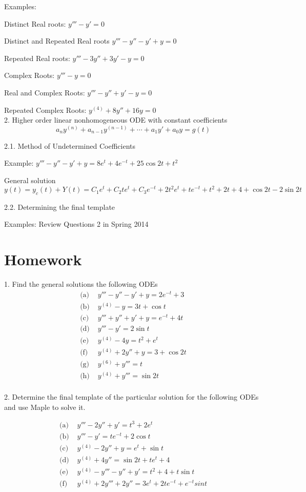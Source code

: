 \documentclass[11pt]{article}
\begin{document}
Examples: 

Distinct Real roots: $y''' - y' = 0$

Distinct and Repeated Real roots $y''' - y'' - y' + y = 0$

Repeated Real roots: $y'''-3y''+3y'-y=0$

Complex Roots: $y''' - y = 0$

Real and Complex Roots: $y''' - y'' + y' - y = 0$

Repeated Complex Roots: $y^{(4)} + 8y'' + 16 y = 0$\\

2. Higher order linear nonhomogeneous ODE with constant coefficients
$$a_n y^{(n)} + a_{n-1}y^{(n-1)}+ \cdots + a_1 y' + a_0 y = g(t)$$


2.1. Method of Undetermined Coefficients

Example: $y''' - y'' - y' + y = 8e^t + 4e^{-t} + 25\cos 2t + t^2 $

General solution
$$y(t)=y_c(t)+Y(t)=C_1e^t + C_2 te^t + C_3 e^{-t}+2t^2 e^t+  te^{-t} + t^2 + 2t + 4 + \cos 2t - 2\sin 2t$$

2.2. Determining the final template

Examples: Review Questions 2 in Spring 2014

\newpage
\section*{Homework}

1. Find the general solutions the following ODEs
$$
\begin{aligned}
\text{(a)  }& y''' - y'' - y' + y = 2e^{-t} + 3\\
\text{(b)  }& y^{(4)} - y = 3t + \cos t\\
\text{(c)  }& y''' + y'' + y' + y = e^{-t} + 4t\\
\text{(d)  }& y''' - y' = 2 \sin t\\
\text{(e)  }& y^{(4)} - 4y = t^2 + e^t\\
\text{(f)  }& y^{(4)} + 2y'' + y = 3 + \cos 2t\\
\text{(g)  }& y^{(6)} + y''' = t \\
\text{(h)  }& y^{(4)} + y''' = \sin 2t\\
\end{aligned}
$$

2. Determine the final template of the particular solution for the following ODEs and use Maple to solve it. 

$$
\begin{aligned}
\text{(a)  }& y''' - 2y'' + y' = t^3 + 2e^t\\
\text{(b)  }& y''' - y' = te^{-t} + 2 \cos t\\
\text{(c)  }& y^{(4)} - 2y'' + y = e^t + \sin t\\
\text{(d)  }& y^{(4)} + 4y'' = \sin 2t + te^t + 4\\
\text{(e)  }& y^{(4)} - y''' - y'' + y' = t^2 + 4 + t \sin t\\
\text{(f)  }& y^{(4)} + 2y''' + 2y'' = 3e^t + 2te^{−t} + e^{−t} sin t\\
\end{aligned}
$$
\end{document}
